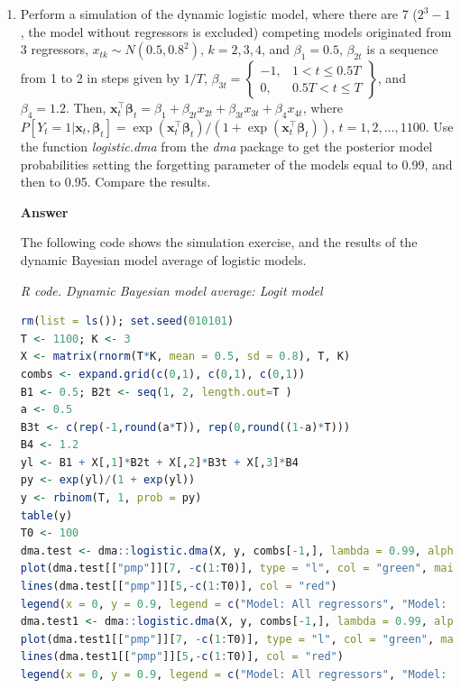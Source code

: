 \begin{enumerate}[leftmargin=*]
\item Perform a simulation of the dynamic logistic model, where there are 7 ($2^3-1$, the model without regressors is excluded) competing models originated from 3 regressors, $x_{tk}\sim N(0.5,0.8^2)$, $k=2,3,4$, and $\beta_1=0.5$, $\beta_{2t}$ is a sequence from 1 to 2 in steps given by $1/T$, $\beta_{3t}=\begin{Bmatrix}
	-1, & 1<t\leq 0.5T\\
	0, & 0.5T< t \leq T
\end{Bmatrix}$, and $\beta_4=1.2$. Then, $\bm{x}_t^{\top}\bm{\beta}_t=\beta_1+\beta_{2t}x_{2t}+\beta_{3t}x_{3t}+\beta_{4}x_{4t}$, where $P[Y_t=1|\bm{x}_t,\bm{\beta}_t]=\exp(\bm{x}_t^{\top}\bm{\beta}_t)/(1+\exp(\bm{x}_t^{\top}\bm{\beta}_t))$, $t=1,2,\dots,1100$. Use the function \textit{logistic.dma} from the \textit{dma} package to get the posterior model probabilities setting the forgetting parameter of the models equal to 0.99, and then to 0.95. Compare the results. 

\textbf{Answer}

The following code shows the simulation exercise, and the results of the dynamic Bayesian model average of logistic models.

\begin{tcolorbox}[enhanced,width=4.67in,center upper,
	fontupper=\large\bfseries,drop shadow southwest,sharp corners]
	\textit{R code. Dynamic Bayesian model average: Logit model}
	\begin{VF}
		\begin{lstlisting}[language=R]
rm(list = ls()); set.seed(010101)
T <- 1100; K <- 3
X <- matrix(rnorm(T*K, mean = 0.5, sd = 0.8), T, K)
combs <- expand.grid(c(0,1), c(0,1), c(0,1))
B1 <- 0.5; B2t <- seq(1, 2, length.out=T )
a <- 0.5
B3t <- c(rep(-1,round(a*T)), rep(0,round((1-a)*T)))
B4 <- 1.2
yl <- B1 + X[,1]*B2t + X[,2]*B3t + X[,3]*B4
py <- exp(yl)/(1 + exp(yl))
y <- rbinom(T, 1, prob = py)
table(y)
T0 <- 100
dma.test <- dma::logistic.dma(X, y, combs[-1,], lambda = 0.99, alpha = 0.99, initialsamp = T0)
plot(dma.test[["pmp"]][7, -c(1:T0)], type = "l", col = "green", main = "Posterior model probability: Model all regressors vs model regressors 1 and 3", xlab = "Time", ylab = "PMP", ylim = c(0, 1))
lines(dma.test[["pmp"]][5,-c(1:T0)], col = "red")
legend(x = 0, y = 0.9, legend = c("Model: All regressors", "Model: Regressors 1 and 3"), col = c("green", "red"), lty=1:1, cex=0.8)
dma.test1 <- dma::logistic.dma(X, y, combs[-1,], lambda = 0.99, alpha = 0.95, initialsamp = T0)
plot(dma.test1[["pmp"]][7, -c(1:T0)], type = "l", col = "green", main = "Posterior model probability: Model all regressors vs model regressors 1 and 3", xlab = "Time", ylab = "PMP", ylim = c(0, 1))
lines(dma.test1[["pmp"]][5,-c(1:T0)], col = "red")
legend(x = 0, y = 0.9, legend = c("Model: All regressors", "Model: Regressors 1 and 3"), col = c("green", "red"), lty=1:1, cex=0.8)
\end{lstlisting}
	\end{VF}
\end{tcolorbox} 


\end{enumerate}
